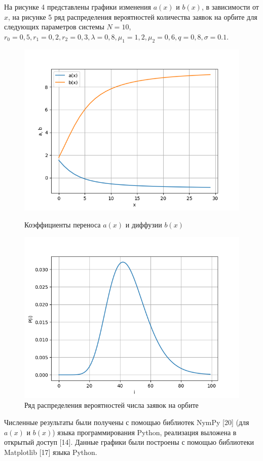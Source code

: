 На рисунке 4 представлены графики изменения $a(x)$ и $b(x)$, в зависимости от $x$, на рисунке 5 ряд распределения вероятностей количества заявок на орбите для следующих параметров системы $N=10$, $r_{0}=0,5, r_{1}=0,2, r_{2}=0,3, \lambda=0,8, \mu_{1}=1,2, \mu_{2}=0,6 , q=0,8, \sigma=0.1.$
\begin{figure}[H]
	\centering
	\begin{minipage}[h]{0.49\linewidth}
		\includegraphics[width=0.8\linewidth]{ab10} 	
		\caption{Коэффициенты переноса $a(x)$ и диффузии $b(x)$}
		\label{ris:experimoriginal}
	\end{minipage}
	\hfill
	\begin{minipage}[h]{0.49\linewidth}
		\includegraphics[width=0.8\linewidth]{P10} 
		\caption{Ряд распределения вероятностей числа заявок на орбите}
		\label{ris:experimcoded}
	\end{minipage}
\end{figure}

Численные результаты были получены с помощью библиотек NymPy [20] (для $a(x)$ и $b(x)$) языка программирования Python, реализация выложена в открытый доступ [14].
Данные графики были построены с помощью библиотеки Matplotlib [17] языка Python.

